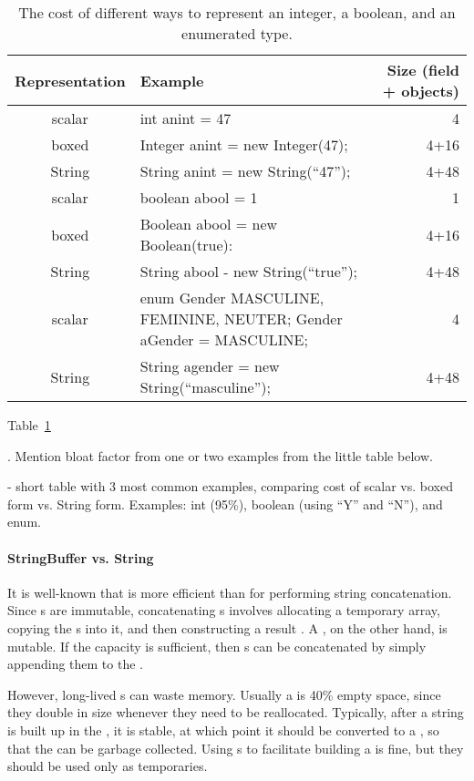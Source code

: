 \begin{table}
  \centering
\begin{tabular}{clr} \toprule
Representation & Example & Size (field + objects) \\ \midrule
scalar & int anint = 47 & 4  \\
boxed & Integer anint = new Integer(47); & 4+16 \\
String & String anint = new String(``47''); & 4+48 \\
\midrule
scalar & boolean abool = 1 & 1 \\
boxed & Boolean abool = new Boolean(true): & 4+16 \\
String & String abool - new String(``true''); & 4+48 \\
\midrule
scalar & enum Gender {MASCULINE, FEMININE, NEUTER}; Gender aGender = MASCULINE;
& 4 \\
String & String agender = new String(``masculine''); & 4+48 \\
\bottomrule
\end{tabular}

\caption{The cost of different ways to represent an integer, a boolean, and an
enumerated type.}
\label{tab:data-sizes}
\end{table}

Table~\ref{tab:data-sizes}

.  Mention
bloat factor from one or two examples from the little table below.




- short table with 3 most common examples, comparing cost of scalar
vs. boxed form vs. String form.  Examples: int (95\%), boolean (using ``Y''
and ``N''), and enum. 

\paragraph{StringBuffer vs. String}

It is well-known that  is more efficient than
 for performing string concatenation. Since s are
immutable, concatenating s involves allocating a temporary
 array, copying the s into it, and then constructing
a result . A , on the other hand, is mutable.
If the  capacity is sufficient, then s
can be concatenated by simply appending them to the .

However, long-lived s can waste memory. Usually a
 is 40\% empty space, since they double in size whenever
they need to be reallocated. Typically, after a string is built up in the
, it is stable, at which point it should be converted 
to a , so that the  can be
garbage collected. Using s to facilitate
building a  is fine, but they should be used only as temporaries.

